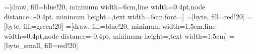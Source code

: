 =[draw, fill=blue!20, minimum width=6cm,line width=0.4pt,node distance=-0.4pt, minimum height=\byteheight,text width=6cm,font={\fontsize{9pt}{0}\selectfont}]
=[byte, fill=red!20]
=[byte, fill=green!20]
=[draw, fill=blue!20, minimum width=1.5cm,line width=0.4pt,node distance=-0.4pt, minimum height=\byteheight,text width=1.5cm]
=[byte_small, fill=red!20]

\usepackage[
backend=biber,
	texencoding=utf8,
bibencoding=utf8,
style=numeric,
citestyle=numeric,
    sortlocale=en_US,
    language=auto,
    backref=true,
    abbreviate=false,
    seconds=true,
    date=iso,
    urldate=iso
]{biblatex}


\usepackage{listings}
\newcommand{\includecode}[4][c]{}
\newcommand{\superscript}[1]{\ensuremath{^{\textrm{#1}}}}
\newcommand{\subscript}[1]{\ensuremath{_{\textrm{#1}}}}




\usepackage[hidelinks]{hyperref} %
\usepackage[nameinlink,noabbrev,capitalise]{cleveref} %
